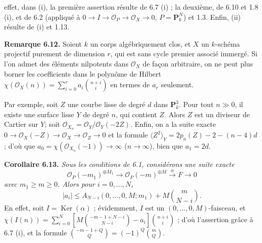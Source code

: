 effet, dans (i), la premi\`ere assertion r\'esulte de 6.7 (i) ; la deuxi\`eme, de 6.10 et 1.8 (i), et de 6.2 (appliqu\'e \`a $0\to I\to\mathcal O_P\to\mathcal O_X\to0$, $P=\mathbf P^N_k$) et 1.3. Enfin, (ii) r\'esulte de (i) et 1.13.

\textbf{Remarque 6.12.} Soient $k$ un corps alg\'ebriquement clos, et $X$ un $k$-sch\'ema projectif purement de dimension $r$, qui est sans cycle premier associ\'e immerg\'e. Si l'on admet des \'el\'ements nilpotents dans $\mathcal O_X$ de fa\c{c}on arbitraire, on ne peut plus borner les coefficients dans le polyn\^ome de Hilbert $\chi(\mathcal O_X(n))=\sum_{i=0}^{r}a_i\binom{n+i}{i}$ en termes de $a_r$ seulement.

Par exemple, soit $Z$ une courbe lisse de degr\'e $d$ dans $\mathbf P^3_k$. Pour tout $n\gg0$, il existe une surface lisse $Y$ de degr\'e $n$, qui contient $Z$. Alors $Z$ est un diviseur de Cartier sur $Y$; soit $\mathcal O_{X_n}=\mathcal O_Y/\mathcal O_Y(-2Z)$. Enfin, on a la suite exacte $0\to\mathcal O_X(-Z)\to\mathcal O_X\to\mathcal O_Z\to0$ et la formule $\langle Z^2\rangle_Y=2p_a(Z)-2-(n-4)d$ ; d'o\`u que $a_0=\chi(\mathcal O_{X_n}(-1))\to\infty$ ($n\to\infty$), bien que $a_1=2d$.

\textbf{Corollaire 6.13.} \emph{Sous les conditions de 6.1, consid\'erons une suite exacte}
\[
   \mathcal O_P(-m_1)^{\oplus M_1}\longrightarrow
   \mathcal O_P(-m)^{\oplus M}\xrightarrow{\alpha}F\longrightarrow0
\]
\emph{avec $m_1\ge m\ge0$. Alors pour $i=0,\ldots,N$,}
\[
   |a_i|\le A_{N-i}(0,\ldots,0,M;m_1)+M\binom{m}{N-i}.
\]
En effet, soit $I=\operatorname{Ker}(\alpha)$ ; \'evidemment, $I$ est un $(0,\ldots,0,M)$-faisceau, et $\chi(I(n))=\sum_{i=0}^{N}\left[M\binom{-m-1+N-i}{N-i}-a_i\right]\binom{n+i}{i}$ ; d'o\`u l'assertion gr\^ace \`a 6.7 (i), et la formule $\binom{-m-1+Q}{Q}=(-1)^Q\binom{m}{Q}$.

